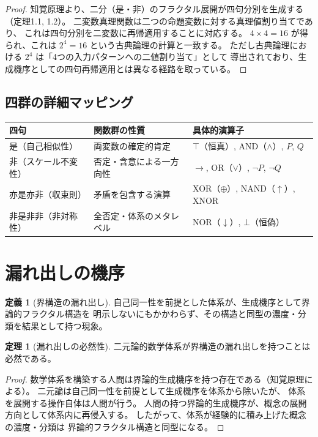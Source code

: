 \documentclass[11pt,a4paper]{article}
\theoremstyle{definition}
\newtheorem{definition}{定義}[section]
\newtheorem{theorem}{定理}[section]
\begin{document}
\begin{proof}
知覚原理より、二分（是・非）のフラクタル展開が四句分別を生成する（定理1.1, 1.2）。
二変数真理関数は二つの命題変数に対する真理値割り当てであり、
これは四句分別を二変数に再帰適用することに対応する。
$4 \times 4 = 16$ が得られ、これは $2^4 = 16$ という古典論理の計算と一致する。
ただし古典論理における $2^4$ は「4つの入力パターンへの二値割り当て」として
導出されており、生成機序としての四句再帰適用とは異なる経路を取っている。
\end{proof}

\subsection{四群の詳細マッピング}

\begin{center}
\renewcommand{\arraystretch}{1.3}
\begin{tabular}{llp{6cm}}
\toprule
四句 & 関数群の性質 & 具体的演算子 \\
\midrule
是（自己相似性） &
  両変数の確定的肯定 &
  $\top$（恒真）, AND（$\wedge$）, $P$, $Q$ \\
非（スケール不変性） &
  否定・含意による一方向性 &
  $\to$, OR（$\vee$）, $\neg P$, $\neg Q$ \\
亦是亦非（収束則） &
  矛盾を包含する演算 &
  XOR（$\oplus$）, NAND（$\uparrow$）, XNOR \\
非是非非（非対称性） &
  全否定・体系のメタレベル &
  NOR（$\downarrow$）, $\bot$（恒偽） \\
\bottomrule
\end{tabular}
\end{center}

\section{漏れ出しの機序}

\begin{definition}[界構造の漏れ出し]
自己同一性を前提とした体系が、生成機序として界論的フラクタル構造を
明示しないにもかかわらず、その構造と同型の濃度・分類を結果として持つ現象。
\end{definition}

\begin{theorem}[漏れ出しの必然性]
二元論的数学体系が界構造の漏れ出しを持つことは必然である。
\end{theorem}

\begin{proof}
数学体系を構築する人間は界論的生成機序を持つ存在である（知覚原理による）。
二元論は自己同一性を前提として生成機序を体系から除いたが、
体系を展開する操作自体は人間が行う。
人間の持つ界論的生成機序が、概念の展開方向として体系内に再侵入する。
したがって、体系が経験的に積み上げた概念の濃度・分類は
界論的フラクタル構造と同型になる。
\end{proof}
\end{document}
